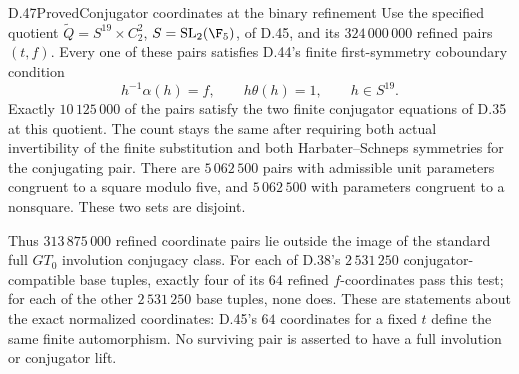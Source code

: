 \begin{claim}{D.47}{Proved}{Conjugator coordinates at the binary refinement}
Use the specified quotient
$\widetilde Q=S^{19}\times C_2^2$, $S=\mathrm{SL}_2(\F_5)$,
of D.45, and its $324\,000\,000$ refined pairs $(t,f)$.
Every one of these pairs satisfies D.44's finite
first-symmetry coboundary condition
\[
       h^{-1}\alpha(h)=f,\qquad h\theta(h)=1,
                         \qquad h\in S^{19}.             \tag{D.47a}
\]
Exactly $10\,125\,000$ of the pairs satisfy the two
finite conjugator equations of D.35 at this quotient.
The count stays the same after requiring both actual
invertibility of the finite substitution and both
Harbater--Schneps symmetries for the conjugating pair.
There are $5\,062\,500$ pairs with admissible unit
parameters congruent to a square modulo five, and
$5\,062\,500$ with parameters congruent to a nonsquare.
These two sets are disjoint.

Thus $313\,875\,000$ refined coordinate pairs lie
outside the image of the standard full $GT_0$
involution conjugacy class.  For each of D.38's
$2\,531\,250$ conjugator-compatible base tuples,
exactly four of its $64$ refined $f$-coordinates
pass this test; for each of the other
$2\,531\,250$ base tuples, none does.
These are statements about the exact normalized
coordinates: D.45's $64$ coordinates for a fixed
$t$ define the same finite automorphism.
No surviving pair is asserted to have a full
involution or conjugator lift.
\end{claim}
